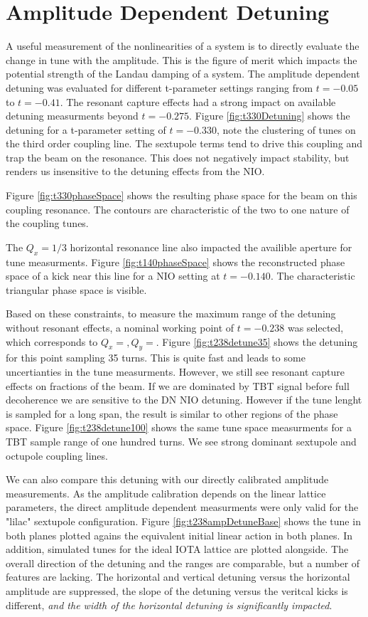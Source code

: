 \section{Amplitude Dependent Detuning} \label{sec:ampDetune}
A useful measurement of the nonlinearities of a system is to directly evaluate the change in tune with the amplitude. This is the figure of merit which impacts the potential strength of the Landau damping of a system. The amplitude dependent detuning was evaluated for different t-parameter settings ranging from $t=-0.05$ to $t=-0.41$. The resonant capture effects had a strong impact on available detuning measurments beyond $t=-0.275$. Figure \ref{fig:t330Detuning} shows the detuning for a t-parameter setting of $t=-0.330$, note the clustering of tunes on the third order coupling line. The sextupole terms tend to drive this coupling and trap the beam on the resonance. This does not negatively impact stability, but renders us insensitive to the detuning effects from the NIO.

Figure \ref{fig:t330phaseSpace} shows the resulting phase space for the beam on this coupling resonance. The contours are characteristic of the two to one nature of the coupling tunes.

The $Q_x = 1/3$ horizontal resonance line also impacted the availible aperture for tune measurments. Figure \ref{fig:t140phaseSpace} shows the reconstructed phase space of a kick near this line for a NIO setting at $t=-0.140$. The characteristic triangular phase space is visible.

Based on these constraints, to measure the maximum range of the detuning without resonant effects, a nominal working point of $t=-0.238$ was selected, which corresponds to $Q_x = , Q_y = $. Figure \ref{fig:t238detune35} shows the detuning for this point sampling 35 turns. This is quite fast and leads to some uncertianties in the tune measurments. However, we still see resonant capture effects on fractions of the beam. If we are dominated by TBT signal before full decoherence we are sensitive to the DN NIO detuning. However if the tune lenght is sampled for a long span, the result is similar to other regions of the phase space. Figure \ref{fig:t238detune100} shows the same tune space measurments for a TBT sample range of one hundred turns. We see strong dominant sextupole and octupole coupling lines.


We can also compare this detuning with our directly calibrated amplitude measurements. As the amplitude calibration depends on the linear lattice parameters, the direct amplitude dependent measurments were only valid for the "lilac" sextupole configuration. Figure \ref{fig:t238ampDetuneBase} shows the tune in both planes plotted agains the equivalent initial linear action in both planes. In addition, simulated tunes for the ideal IOTA lattice are plotted alongside. The overall direction of the detuning and the ranges are comparable, but a number of features are lacking. The horizontal and vertical detuning versus the horizontal amplitude are suppressed, the slope of the detuning versus the veritcal kicks is different, \textit{and the width of the horizontal detuning is significantly impacted}.

